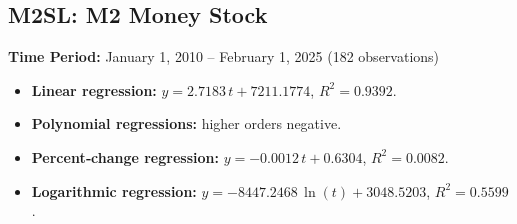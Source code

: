 \documentclass[11pt,a4paper]{article}
\begin{document}
\clearpage
\subsection{M2SL: M2 Money Stock}
\textbf{Time Period:} January 1, 2010 – February 1, 2025 (182 observations)

\begin{itemize}
  \item \textbf{Linear regression:} \(y = 2.7183\,t + 7211.1774\), \(R^2 = 0.9392\).
  \item \textbf{Polynomial regressions:} higher orders negative.
  \item \textbf{Percent‐change regression:} \(y = -0.0012\,t + 0.6304\), \(R^2 = 0.0082\).
  \item \textbf{Logarithmic regression:} \(y = -8447.2468\,\ln(t) + 3048.5203\), \(R^2 = 0.5599\).
\end{itemize}
\end{document}
